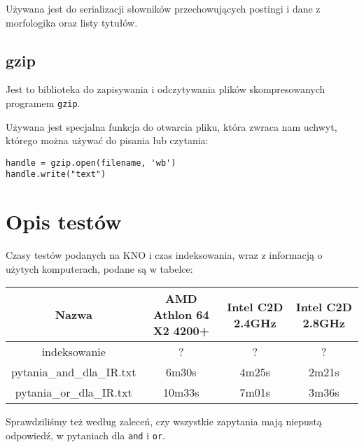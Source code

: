 \documentclass[11pt]{article}
\begin{document}
Używana jest do serializacji słowników przechowujących postingi i dane z morfologika oraz listy tytułów.

\subsection{gzip}
Jest to biblioteka do zapisywania i odczytywania plików skompresowanych programem \texttt{gzip}.

Używana jest specjalna funkcja do otwarcia pliku, która zwraca nam uchwyt, którego można używać do pisania lub czytania:
\begin{verbatim}
handle = gzip.open(filename, 'wb') 
handle.write("text")
\end{verbatim}

\section{Opis testów}
Czasy testów podanych na KNO i czas indeksowania, wraz z informacją o użytych komputerach, podane są w tabelce:
\begin{center}
\begin{tabular}{|c|c|c|c|}
\hline
Nazwa & AMD Athlon 64 X2 4200+ & Intel C2D 2.4GHz & Intel C2D 2.8GHz \\ \hline
indeksowanie & ? & ? & ? \\ \hline
pytania\_and\_dla\_IR.txt & 6m30s & 4m25s & 2m21s \\ \hline
pytania\_or\_dla\_IR.txt & 10m33s & 7m01s & 3m36s \\ \hline
\end{tabular}
\end{center}

Sprawdziliśmy też według zaleceń, czy wszystkie zapytania mają niepustą odpowiedź, w pytaniach dla \texttt{and} i \texttt{or}.
\end{document}
